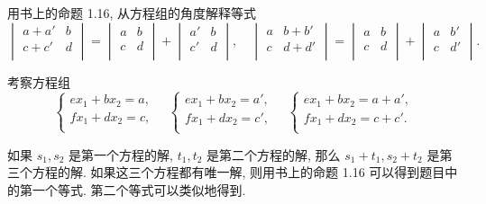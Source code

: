 \documentclass[color=black,device=normal,lang=cn,mode=geye]{elegantnote}
\begin{document}
\begin{exercisec}[1.18(3)]
    用书上的命题 1.16, 从方程组的角度解释等式
    \[\begin{vmatrix}
        a+a' & b \\
        c+c' & d \\
    \end{vmatrix}=\begin{vmatrix}
        a & b \\
        c & d \\
    \end{vmatrix}+\begin{vmatrix}
        a' & b \\
        c' & d \\
    \end{vmatrix},\quad\begin{vmatrix}
        a & b+b' \\
        c & d+d' \\
    \end{vmatrix}=\begin{vmatrix}
        a & b \\
        c & d \\
    \end{vmatrix}+\begin{vmatrix}
        a & b' \\
        c & d' \\
    \end{vmatrix}.\]
\end{exercisec}
\begin{solution}
    考察方程组
    \[\begin{cases}
        ex_1+bx_2=a, \\
        fx_1+dx_2=c, \\
    \end{cases}\quad\begin{cases}
        ex_1+bx_2=a', \\
        fx_1+dx_2=c', \\
    \end{cases}\quad\begin{cases}
        ex_1+bx_2=a+a', \\
        fx_1+dx_2=c+c'. \\
    \end{cases}\]

    如果 $s_1,s_2$ 是第一个方程的解, $t_1,t_2$ 是第二个方程的解, 那么 $s_1+t_1,s_2+t_2$ 是第三个方程的解. 如果这三个方程都有唯一解, 则用书上的命题 1.16 可以得到题目中的第一个等式. 第二个等式可以类似地得到.
\end{solution}
\end{document}

